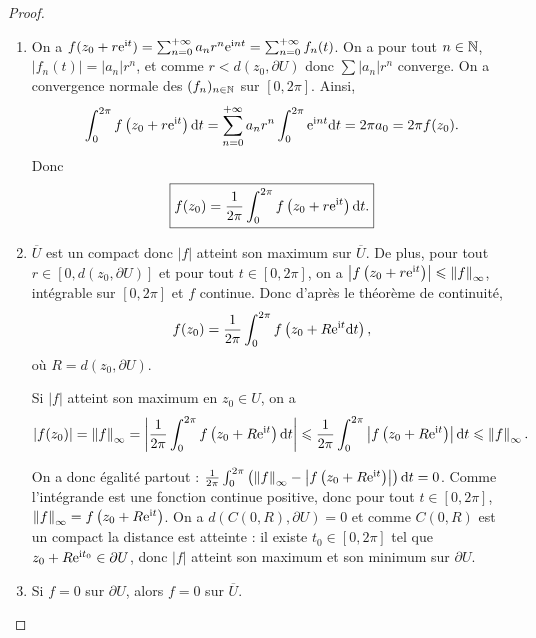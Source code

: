 \documentclass[12pt]{article}
\begin{document}
\begin{proof}
    \phantom{}
    \begin{enumerate}
        \item On a $f(z_{0}+r\mathrm{e}^{\mathrm{i} t})=\sum_{n=0}^{+\infty}a_n r^{n}\mathrm{e}^{\mathrm{i} nt}=\sum_{n=0}^{+\infty}f_n(t)$. On a pour tout $n\in\mathbb{N}$, $\left\lvert f_n(t)\right\rvert=\left\lvert a_n\right\rvert r^{n}$, et comme $r<d(z_{0},\partial U)$ donc $\sum \left\lvert a_n\right\rvert r^{n}$ converge. On a convergence normale des $(f_n)_{n\in\mathbb{N}}$ sur $[0,2\pi]$.
        Ainsi,
        \begin{equation}
            \int_{0}^{2\pi}f\left(z_{0}+r\mathrm{e}^{\mathrm{i} t}\right)\mathrm{d} t=\sum_{n=0}^{+\infty}a_n r^{n}\int_{0}^{2\pi}\mathrm{e}^{\mathrm{i} nt}\mathrm{d} t=2\pi a_0=2\pi f(z_{0}).
        \end{equation}
        Donc 
        \begin{equation}
            \boxed{
                f(z_{0})=\frac{1}{2\pi}\int_{0}^{2\pi}f\left(z_0+r\mathrm{e}^{\mathrm{i} t}\right)\mathrm{d} t.
            }
        \end{equation}

        \item $\overline{U}$ est un compact donc $\left\lvert f\right\rvert$ atteint son maximum sur $\overline{U}$. De plus, pour tout $r\in[0,d(z_{0},\partial U)]$ et pour tout $t\in[0,2\pi]$, on a $\left\lvert f\left(z_{0}+r\mathrm{e}^{\mathrm{i} t}\right)\right\rvert\leqslant\left\lVert f\right\rVert_{\infty}$, intégrable sur $[0,2\pi]$ et $f$ continue. Donc d'après le théorème de continuité, 
        \begin{equation*}
            f(z_{0})=\frac{1}{2\pi}\int_{0}^{2\pi}f\left(z_0+R\mathrm{e}^{\mathrm{i} t}\mathrm{d} t\right),    
        \end{equation*}
        où $R=d(z_{0},\partial U)$.
        
        Si $\left\lvert f\right\rvert$ atteint son maximum en $z_{0}\in U$, on a 
        \begin{equation}
            \left\lvert f(z_{0})\right\rvert=\left\lVert f\right\rVert_{\infty}=\left\lvert \frac{1}{2\pi}\int_{0}^{2\pi}f\left(z_{0}+R\mathrm{e}^{\mathrm{i} t}\right)\mathrm{d} t\right\rvert\leqslant\frac{1}{2\pi}\int_{0}^{2\pi}\left\lvert f\left(z_{0}+R\mathrm{e}^{\mathrm{i} t}\right)\right\rvert\mathrm{d} t\leqslant\left\lVert f\right\rVert_{\infty}.
        \end{equation}

        On a donc égalité partout : $\frac{1}{2\pi}\int_{0}^{2\pi}\left(\left\lVert f\right\rVert_{\infty}-\left\lvert f\left(z_0+R\mathrm{e}^{\mathrm{i} t}\right)\right\rvert\right)\mathrm{d} t=0$. Comme l'intégrande est une fonction continue positive, donc pour tout $t\in[0,2\pi]$, $\left\lVert f\right\rVert_{\infty}=f\left(z_{0}+R\mathrm{e}^{\mathrm{i} t}\right)$. On a $d\left(C(0,R),\partial U\right)=0$ et comme $C(0,R)$ est un compact la distance est atteinte : il existe $t_{0}\in[0,2\pi]$ tel que $z_{0}+R\mathrm{e}^{\mathrm{i} t_0}\in\partial U$, donc $\left\lvert f\right\rvert$ atteint son maximum et son minimum sur $\partial U$.

        \item Si $f=0$ sur $\partial U$, alors $f=0$ sur $\overline{U}$.
    \end{enumerate}
\end{proof}
\end{document}
